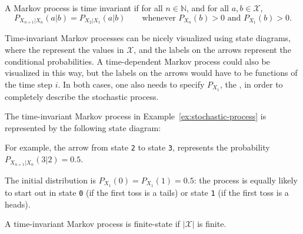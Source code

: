 \begin{definition}
A Markov process is time invariant if for all $n \in \mathbb{N}$, and for all $a,b \in \mathcal{X}$,
\[
P_{X_{n+1} | X_n}(a|b) = P_{X_2 | X_1}(a|b) \qquad \text{whenever } P_{X_n}(b) > 0 \text{ and } P_{X_1}(b) > 0.
\]
\end{definition}

Time-invariant Markov processes can be nicely visualized using state diagrams, where the  represent the values in $\mathcal{X}$, and the labels on the arrows represent the conditional probabilities. A time-dependent Markov process could also be visualized in this way, but the labels on the arrows would have to be functions of the time step $i$. In both cases, one also needs to specify $P_{X_1}$, the , in order to completely describe the stochastic process.

\begin{example}\label{ex:markov-diagram-infinite}
The time-invariant Markov process in Example~\ref{ex:stochastic-process} is represented by the following state diagram:
\begin{center}
\end{center}
For example, the arrow from state \texttt{2} to state \texttt{3}, represents the probability $P_{X_{n+1}|X_{n}}(3|2) = 0.5$.

The initial distribution is $P_{X_1}(0) = P_{X_1}(1) = 0.5$: the process is equally likely to start out in state \texttt{0} (if the first toss is a tails) or state \texttt{1} (if the first toss is a heads).
\end{example}

\begin{definition}
A time-invariant Markov process is finite-state if $|\mathcal{X}|$ is finite.
\end{definition}

